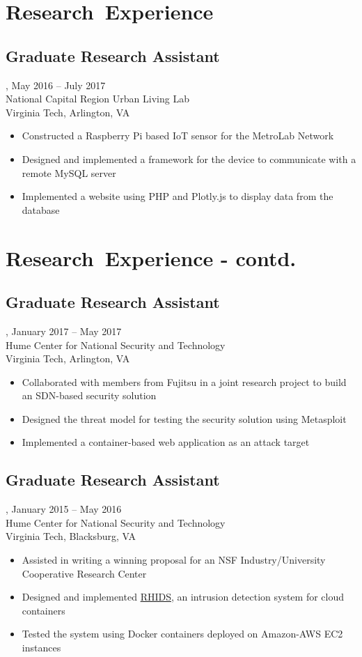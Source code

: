\section{Research~Experience}
\subsection{Graduate Research Assistant}, May 2016 -- July 2017\\
National Capital Region Urban Living Lab\\
Virginia Tech, Arlington, VA
\begin{itemize}
\item Constructed a Raspberry Pi based IoT sensor for the MetroLab Network
\item Designed and implemented a framework for the device to communicate with a remote MySQL server
\item Implemented a website using PHP and Plotly.js to display data from the database
\end{itemize}
\section{Research~Experience - contd.}
\subsection{Graduate Research Assistant}, January 2017 -- May 2017\\
Hume Center for National Security and Technology\\
Virginia Tech, Arlington, VA
\begin{itemize}
\item Collaborated with members from Fujitsu in a joint research project to build an SDN-based security solution
\item Designed the threat model for testing the security solution using Metasploit
\item Implemented a container-based web application as an attack target
\end{itemize}
\subsection{Graduate Research Assistant}, January 2015 -- May 2016\\
Hume Center for National Security and Technology\\
Virginia Tech, Blacksburg, VA
\begin{itemize}
\item Assisted in writing a winning proposal for an NSF Industry/University Cooperative Research Center
\item Designed and implemented \href{https://github.com/amrabed/rhids}{RHIDS}, an intrusion detection system for cloud containers
\item Tested the system using Docker containers deployed on Amazon-AWS EC2 instances
\end{itemize}

